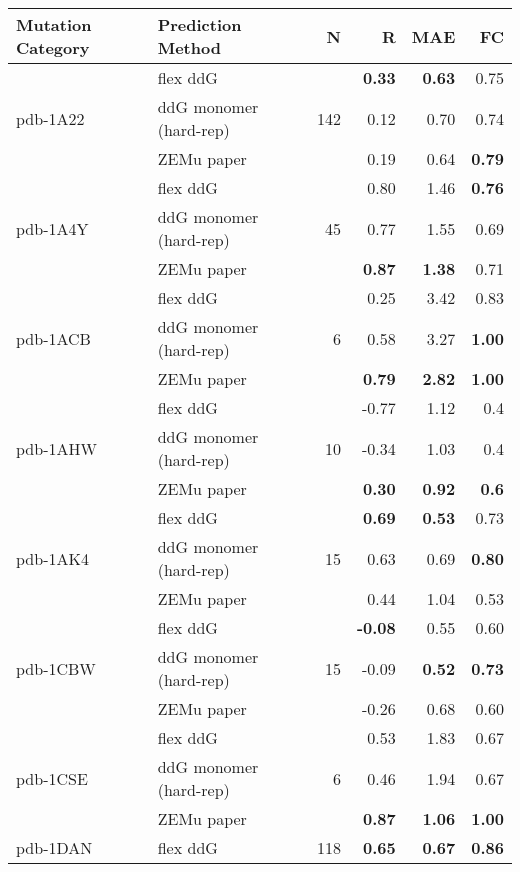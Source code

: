 \begin{longtable}{llrrrr}
\hline
Mutation Category &       Prediction Method &   N &     R &  MAE &   FC \\
\hline
 \multirow{ 3}{*}{pdb-1A22} & flex ddG & \multirow{ 3}{*}{142} & \textbf{0.33} & \textbf{0.63} & 0.75  \\
 & ddG monomer (hard-rep) & & 0.12 & 0.70 & 0.74  \\
 & ZEMu paper & & 0.19 & 0.64 & \textbf{0.79}  \\
\hline
 \multirow{ 3}{*}{pdb-1A4Y} & flex ddG & \multirow{ 3}{*}{45} & 0.80 & 1.46 & \textbf{0.76}  \\
 & ddG monomer (hard-rep) & & 0.77 & 1.55 & 0.69  \\
 & ZEMu paper & & \textbf{0.87} & \textbf{1.38} & 0.71  \\
\hline
 \multirow{ 3}{*}{pdb-1ACB} & flex ddG & \multirow{ 3}{*}{6} & 0.25 & 3.42 & 0.83  \\
 & ddG monomer (hard-rep) & & 0.58 & 3.27 & \textbf{1.00}  \\
 & ZEMu paper & & \textbf{0.79} & \textbf{2.82} & \textbf{1.00}  \\
\hline
 \multirow{ 3}{*}{pdb-1AHW} & flex ddG & \multirow{ 3}{*}{10} & -0.77 & 1.12 & 0.4  \\
 & ddG monomer (hard-rep) & & -0.34 & 1.03 & 0.4  \\
 & ZEMu paper & & \textbf{0.30} & \textbf{0.92} & \textbf{0.6}  \\
\hline
 \multirow{ 3}{*}{pdb-1AK4} & flex ddG & \multirow{ 3}{*}{15} & \textbf{0.69} & \textbf{0.53} & 0.73  \\
 & ddG monomer (hard-rep) & & 0.63 & 0.69 & \textbf{0.80}  \\
 & ZEMu paper & & 0.44 & 1.04 & 0.53  \\
\hline
 \multirow{ 3}{*}{pdb-1CBW} & flex ddG & \multirow{ 3}{*}{15} & \textbf{-0.08} & 0.55 & 0.60  \\
 & ddG monomer (hard-rep) & & -0.09 & \textbf{0.52} & \textbf{0.73}  \\
 & ZEMu paper & & -0.26 & 0.68 & 0.60  \\
\hline
 \multirow{ 3}{*}{pdb-1CSE} & flex ddG & \multirow{ 3}{*}{6} & 0.53 & 1.83 & 0.67  \\
 & ddG monomer (hard-rep) & & 0.46 & 1.94 & 0.67  \\
 & ZEMu paper & & \textbf{0.87} & \textbf{1.06} & \textbf{1.00}  \\
\hline
 \multirow{ 3}{*}{pdb-1DAN} & flex ddG & \multirow{ 3}{*}{118} & \textbf{0.65} & \textbf{0.67} & \textbf{0.86}  \\

\end{longtable}

